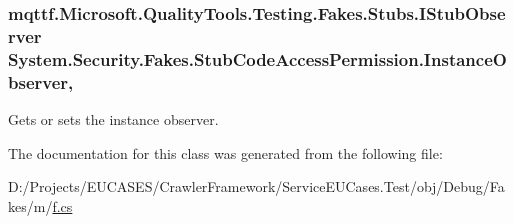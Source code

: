 \hypertarget{class_system_1_1_security_1_1_fakes_1_1_stub_code_access_permission_a4f9c5af3cacdbf5baa430e4344455217}{
\subsubsection[{Instance\-Observer}]{\setlength{\rightskip}{0pt plus 5cm}mqttf.\-Microsoft.\-Quality\-Tools.\-Testing.\-Fakes.\-Stubs.\-I\-Stub\-Observer System.\-Security.\-Fakes.\-Stub\-Code\-Access\-Permission.\-Instance\-Observer\hspace{0.3cm}{\ttfamily [get]}, {\ttfamily [set]}}}\label{class_system_1_1_security_1_1_fakes_1_1_stub_code_access_permission_a4f9c5af3cacdbf5baa430e4344455217}


Gets or sets the instance observer.



The documentation for this class was generated from the following file\-:\begin{DoxyCompactItemize}
\item 
D\-:/\-Projects/\-E\-U\-C\-A\-S\-E\-S/\-Crawler\-Framework/\-Service\-E\-U\-Cases.\-Test/obj/\-Debug/\-Fakes/m/\hyperlink{m_2f_8cs}{f.\-cs}\end{DoxyCompactItemize}
